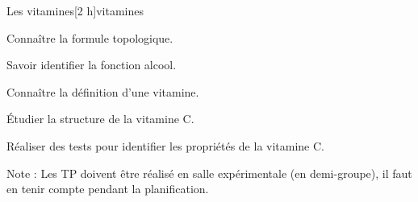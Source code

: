\begin{multicols}{2}
  \begin{TP}{Les vitamines}[2 h]{vitamines}
    \begin{prerequis}
      \item Connaître la formule topologique.
      \item Savoir identifier la fonction alcool.
    \end{prerequis}
    \begin{objectifs}
      \item Connaître la définition d'une vitamine.
      \item Étudier la structure de la vitamine C.
      \item Réaliser des tests pour identifier les propriétés de la vitamine C.
    \end{objectifs}
  \end{TP}
\end{multicols}


Note :
Les TP doivent être réalisé en salle expérimentale (en demi-groupe), il faut en tenir compte pendant la planification.


\newpage
\nomPrenomClasse
{}
\vspace*{24pt}

\vspace*{-12.8 cm}

\begin{programmeSeance}
\end{programmeSeance}
\vspace*{1.2 cm}

